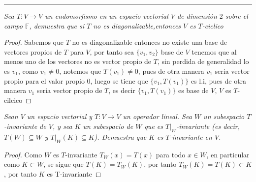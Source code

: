 \documentclass[11pt]{article}
\begin{document}
\rule{17cm}{0.1mm}

\begin{tcolorbox}[title = \textcolor{black}{\textcolor{white}{Problema 1}}]
\textit{Sea $T:V\rightarrow V$ un endomorfismo en un espacio vectorial $V$ de dimensi\'on $2$ sobre el campo $\mathbb{F}$, demuestra que si $T$ no es diagonalizable,entonces $V$ es $T$-ciclico
}
\end{tcolorbox}
\begin{proof}
  Sabemos que $T$ no es diagonalizable entonces no existe una base de vectores propios de $T$ para $V$, por tanto sea $\{v_1,v_2\}$ base de $V$ tenemos que al menos uno de los vectores no es vector propio de $T$, sin perdida de generalidad
  lo es $v_1$, como $v_1\neq 0$, notemos que $T(v_1)\neq 0$, pues de otra manera $v_1$ seria vector propio para el valor propio $0$, luego se tiene que $\{v_1,T(v_1)\}$ es l.i, pues de otra manera $v_1$ seria vector propio de $T$, es decir $\{v_1,T(v_1)\}$ es base de $V$, $V$ es $T$-cilcico
\end{proof}
\begin{tcolorbox}[title = \textcolor{black}{\textcolor{white}{Problema 2}}]
\textit{
Sean \( V \) un espacio vectorial y \( T : V \rightarrow V \) un operador lineal. Sea \( W \) un subespacio \( T \)-invariante de \( V \), y sea \( K \) un subespacio de \( W \) que es \( T|_W \)-invariante (es decir, \( T(W) \subseteq W \) y \( T|_W(K) \subseteq K \)). Demuestra que \( K \) es \( T \)-invariante en \( V \).
}
\end{tcolorbox}
\begin{proof}
    Como $W$ es $T$-invariante $T_{W}(x)=T(x)$ para todo $x\in W$, en particular como $K\subset W$, se sigue que $T(K)=T_{W}(K)$, por tanto $T_{W}(K)=T(K)\subset K$, por tanto $K$ es T-invariante
\end{proof}
\newpage
{}
\end{document}
